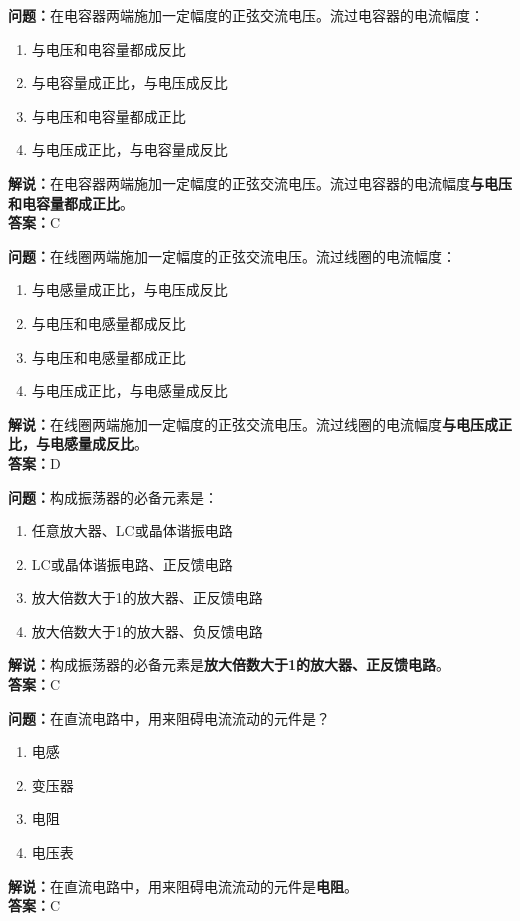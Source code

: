 \bigskip


\noindent\textbf{问题：}在电容器两端施加一定幅度的正弦交流电压。流过电容器的电流幅度：
\begin{enumerate}[label=\Alph*), leftmargin=3em]
\item 与电压和电容量都成反比
\item 与电容量成正比，与电压成反比
\item 与电压和电容量都成正比
\item 与电压成正比，与电容量成反比
\end{enumerate}
\noindent\textbf{解说：}在电容器两端施加一定幅度的正弦交流电压。流过电容器的电流幅度\textbf{与电压和电容量都成正比}。\\\noindent\textbf{答案：}C


\bigskip


\noindent\textbf{问题：}在线圈两端施加一定幅度的正弦交流电压。流过线圈的电流幅度：
\begin{enumerate}[label=\Alph*), leftmargin=3em]
\item 与电感量成正比，与电压成反比
\item 与电压和电感量都成反比
\item 与电压和电感量都成正比
\item 与电压成正比，与电感量成反比
\end{enumerate}
\noindent\textbf{解说：}在线圈两端施加一定幅度的正弦交流电压。流过线圈的电流幅度\textbf{与电压成正比，与电感量成反比}。\\\noindent\textbf{答案：}D

\bigskip


\noindent\textbf{问题：}构成振荡器的必备元素是：
\begin{enumerate}[label=\Alph*), leftmargin=3em]
\item 任意放大器、LC或晶体谐振电路
\item LC或晶体谐振电路、正反馈电路
\item 放大倍数大于1的放大器、正反馈电路
\item 放大倍数大于1的放大器、负反馈电路
\end{enumerate}
\noindent\textbf{解说：}构成振荡器的必备元素是\textbf{放大倍数大于1的放大器、正反馈电路}。\\\noindent\textbf{答案：}C

\bigskip


\noindent\textbf{问题：}在直流电路中，用来阻碍电流流动的元件是？
\begin{enumerate}[label=\Alph*), leftmargin=3em]
\item 电感
\item 变压器
\item 电阻
\item 电压表
\end{enumerate}
\noindent\textbf{解说：}在直流电路中，用来阻碍电流流动的元件是\textbf{电阻}。\\\noindent\textbf{答案：}C


